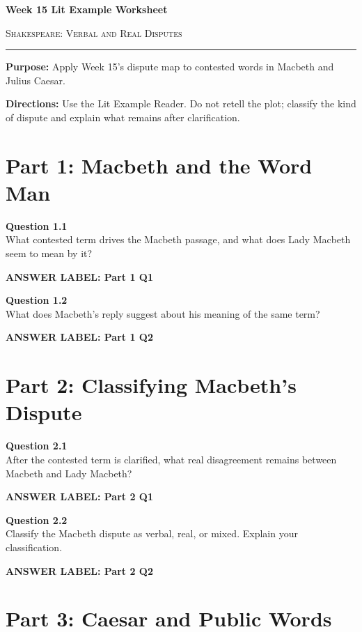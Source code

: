 \documentclass[12pt]{article}
\newcommand{\answerbox}[2]{%
\vspace{0.12em}
\noindent\textbf{#1}\par
\vspace{0.04em}
\noindent\fbox{%
\begin{minipage}[t][#2]{\dimexpr\textwidth-2\fboxsep-2\fboxrule}
\rule{\textwidth}{0pt}
\vspace{#2}
\end{minipage}}
\par\vspace{0.22em}}
\begin{document}
\begin{center}
{\LARGE\bfseries Week 15 Lit Example Worksheet}\par\vspace{0.05em}
{\large\scshape Shakespeare: Verbal and Real Disputes}\par\vspace{0.12em}
\rule{0.78\textwidth}{0.5pt}
\end{center}

\textbf{Purpose:} Apply Week 15's dispute map to contested words in Macbeth and Julius Caesar.

\textbf{Directions:} Use the Lit Example Reader. Do not retell the plot; classify the kind of dispute and explain what remains after clarification.

\section*{Part 1: Macbeth and the Word Man}

\textbf{Question 1.1}\\[-0.15em]
What contested term drives the Macbeth passage, and what does Lady Macbeth seem to mean by it?

\answerbox{ANSWER LABEL: Part 1 Q1}{2.05in}

\textbf{Question 1.2}\\[-0.15em]
What does Macbeth's reply suggest about his meaning of the same term?

\answerbox{ANSWER LABEL: Part 1 Q2}{2.1in}

\newpage

\section*{Part 2: Classifying Macbeth's Dispute}

\textbf{Question 2.1}\\[-0.15em]
After the contested term is clarified, what real disagreement remains between Macbeth and Lady Macbeth?

\answerbox{ANSWER LABEL: Part 2 Q1}{2.35in}

\textbf{Question 2.2}\\[-0.15em]
Classify the Macbeth dispute as verbal, real, or mixed. Explain your classification.

\answerbox{ANSWER LABEL: Part 2 Q2}{2.45in}

\newpage

\section*{Part 3: Caesar and Public Words}
\end{document}
